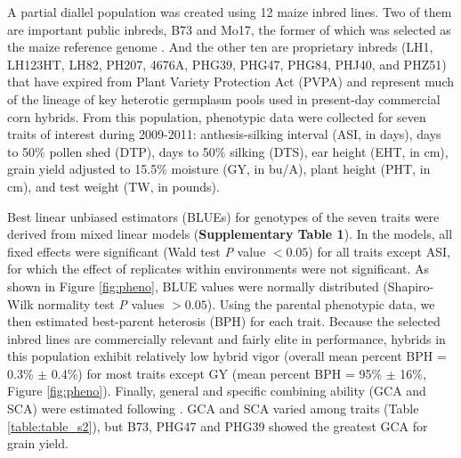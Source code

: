 \documentclass[twoside,twocolumn, letterpaper]{article}
\newcommand{\jri}[1]{\textcolor{red}{ \emph{ #1}} }
\begin{document}
A partial diallel population was created using 12 maize inbred lines. Two of them are important public inbreds, B73 and Mo17, the former of which was selected as the maize reference genome \citep{schnable2009b73}. And the other ten are proprietary inbreds (LH1, LH123HT, LH82, PH207, 4676A, PHG39, PHG47, PHG84, PHJ40, and PHZ51) that have expired from Plant Variety Protection Act (PVPA) \citep{nelson2008molecular} and represent much of the lineage of key heterotic germplasm pools used in present-day commercial corn hybrids.
From this population, phenotypic data were collected for seven traits of interest during 2009-2011: anthesis-silking interval (ASI, in days), days to 50\% pollen shed (DTP), days to 50\% silking (DTS), ear height (EHT, in cm), grain yield adjusted to 15.5\% moisture (GY, in bu/A), plant height (PHT, in cm), and test weight (TW, in pounds).

Best linear unbiased estimators (BLUEs) for genotypes of the seven traits were derived from mixed linear models (\textbf{Supplementary Table 1}).
In the models, all fixed effects were significant (Wald test \emph{P} value $<0.05$) for all traits except ASI, for which the effect of replicates within environments were not significant. 
As shown in Figure \ref{fig:pheno}, BLUE values were normally distributed (Shapiro-Wilk normality test \emph{P} values $>0.05$). 
Using the parental phenotypic data, we then estimated best-parent heterosis (BPH) for each trait.  
Because the selected inbred lines are commercially relevant and fairly elite in performance, hybrids in this population exhibit relatively low hybrid vigor (overall mean percent BPH = 0.3\% $\pm$ 0.4\%) for most traits except GY (mean percent BPH = 95\% $\pm$ 16\%, Figure \ref{fig:pheno}). 
Finally, general and specific combining ability (GCA and SCA) were estimated following \citep{Falconer1996}. 
GCA and SCA varied among traits (Table \ref{table:table_s2}), but B73, PHG47 and PHG39 showed the greatest GCA for grain yield. 


\end{document}
